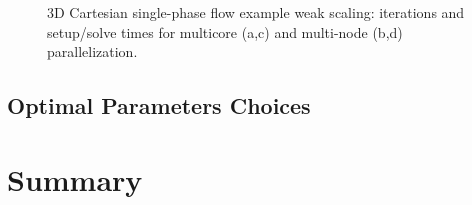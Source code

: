 \begin{figure} [htbp]
  \begin{subfigure}[t]{0.48\textwidth}
    \centering
    
    \caption{}
    \label{fig:cart_scaling_weak_flow_omp_iter}
  \end{subfigure}
  \hfill
  \begin{subfigure}[t]{0.48\textwidth}
    \centering
    
    \caption{}
    \label{fig:cart_scaling_weak_flow_mpi_iter}
  \end{subfigure}
  \par\bigskip 
  \begin{subfigure}[t]{0.48\textwidth}
    \centering
    
    \caption{}
    \label{fig:cart_scaling_weak_flow_omp_time}
  \end{subfigure}
  \hfill
  \begin{subfigure}[t]{0.48\textwidth}
    \centering
    
    \caption{}
    \label{fig:cart_scaling_weak_flow_mpi_time}
  \end{subfigure}
  \caption[3D Cartesian single-phase flow example weak scaling]{3D Cartesian single-phase flow example weak scaling: iterations and setup/solve times for multicore (a,c) and multi-node (b,d) parallelization.}
  \label{fig:cart_scaling_weak_flow}
\end{figure}

\subsection{Optimal Parameters Choices}

\section{Summary}
\label{sec:par_summary}